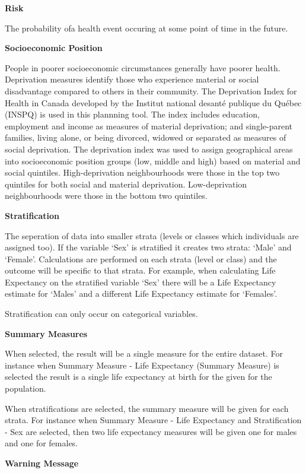 \documentclass[]{book}
\begin{document}
\textbf{Risk}

The probability ofa health event occuring at some point of time in the
future.

\textbf{Socioeconomic Position}

People in poorer socioeconomic circumstances generally have poorer
health. Deprivation measures identify those who experience material or
social disadvantage compared to others in their community. The
Deprivation Index for Health in Canada developed by the Institut
national desanté publique du Québec (INSPQ)\citep{INSPQ2000} is used in
this plannning tool. The index includes education, employment and income
as measures of material deprivation; and single-parent families, living
alone, or being divorced, widowed or separated as measures of social
deprivation. The deprivation index was used to assign geographical areas
into socioeconomic position groups (low, middle and high) based on
material and social quintiles. High-deprivation neighbourhoods were
those in the top two quintiles for both social and material deprivation.
Low-deprivation neighbourhoods were those in the bottom two quintiles.

\textbf{Stratification}

The seperation of data into smaller strata (levels or
classes which individuals are assigned too). If the variable `Sex' is
stratified it creates two strata: `Male' and `Female'. Calculations are
performed on each strata (level or class) and the outcome will be
specific to that strata. For example, when calculating Life Expectancy
on the stratified variable `Sex' there will be a Life Expectancy
estimate for `Males' and a different Life Expectancy estimate for
`Females'.

Stratification can only occur on categorical variables.

\textbf{Summary Measures}

When selected, the result will be a single measure for
the entire dataset. For instance when Summary Measure - Life Expectancy
(Summary Measure) is selected the result is a single life expectancy at
birth for the given for the population.

When stratifications are selected, the summary
measure will be given for each strata. For instance when Summary Measure
- Life Expectancy and Stratification - Sex are selected, then two life
expectancy measures will be given one for males and one for females.

\textbf{Warning Message}
\end{document}
